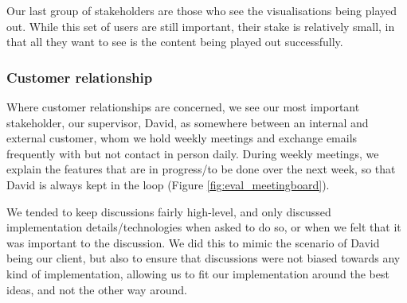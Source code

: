 \documentclass[a4paper, titlepage]{article}
\begin{document}
Our last group of stakeholders are those who see the visualisations being played out. While this set of users are still important, their stake is relatively small, in that all they want to see is the content being played out successfully.

\subsubsection{Customer relationship}

Where customer relationships are concerned, we see our most important stakeholder, our supervisor, David, as somewhere between an internal and external customer, whom we hold weekly meetings and exchange emails frequently with but not contact in person daily. During weekly meetings, we explain the features that are in progress/to be done over the next week, so that David is always kept in the loop (Figure \ref{fig:eval_meetingboard}).

We tended to keep discussions fairly high-level, and only discussed implementation details/technologies when asked to do so, or when we felt that it was important to the discussion. We did this to mimic the scenario of David being our client, but also to ensure that discussions were not biased towards any kind of implementation, allowing us to fit our implementation around the best ideas, and not the other way around.
\end{document}
